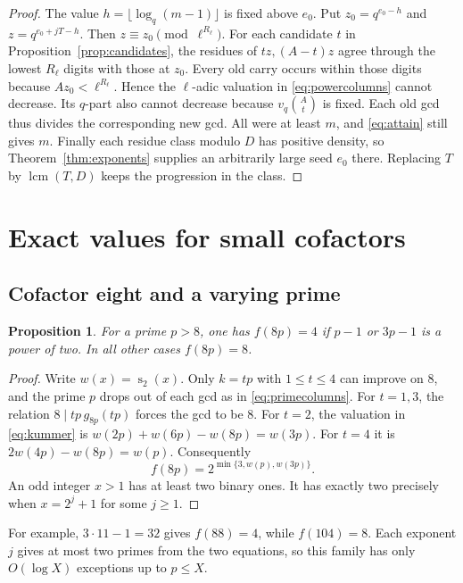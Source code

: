 \documentclass[a4paper,11pt]{article}
\newtheorem{proposition}[theorem]{Proposition}
\newcommand{\colg}[2]{g_{#1}(#2)}
\newcommand{\ds}{\operatorname{s}}
\newcommand{\lcm}{\operatorname{lcm}}
\begin{document}
\begin{proof}
The value \(h=\lfloor\log_q(m-1)\rfloor\) is fixed above \(e_0\).
Put \(z_0=q^{e_0-h}\) and \(z=q^{e_0+jT-h}\). Then
\(z\equiv z_0\pmod{\ell^{R_\ell}}\). For each candidate \(t\) in
Proposition~\ref{prop:candidates}, the residues of \(tz,(A-t)z\) agree
through the lowest \(R_\ell\) digits with those at \(z_0\).
Every old carry occurs within those digits because \(Az_0<\ell^{R_\ell}\).
Hence the \(\ell\)-adic valuation in \eqref{eq:powercolumns} cannot
decrease. Its \(q\)-part also cannot decrease because \(v_q\binom At\)
is fixed. Each old gcd thus divides the corresponding new gcd. All were
at least \(m\), and \eqref{eq:attain} still gives \(m\).
Finally each residue class modulo \(D\) has positive density, so
Theorem~\ref{thm:exponents} supplies an arbitrarily large seed \(e_0\)
there. Replacing \(T\) by \(\lcm(T,D)\) keeps the progression in the class.
\end{proof}

\newpage
\section{Exact values for small cofactors}\label{sec:families}

\subsection{Cofactor eight and a varying prime}

\begin{proposition}\label{prop:eight}
For a prime \(p>8\), one has \(f(8p)=4\) if \(p-1\) or \(3p-1\) is
a power of two. In all other cases \(f(8p)=8\).
\end{proposition}

\begin{proof}
Write \(w(x)=\ds_2(x)\). Only \(k=tp\) with \(1\le t\le4\) can improve
on \(8\), and the prime \(p\) drops out of each gcd as in
\eqref{eq:primecolumns}. For \(t=1,3\), the relation
\(8\mid tp\,\colg{8p}{tp}\) forces the gcd to be \(8\).
For \(t=2\), the valuation in \eqref{eq:kummer} is
\(w(2p)+w(6p)-w(8p)=w(3p)\). For \(t=4\) it is \(2w(4p)-w(8p)=w(p)\).
Consequently
\[
  f(8p)=2^{\min\{3,w(p),w(3p)\}} .
\]
An odd integer \(x>1\) has at least two binary ones. It has exactly two
precisely when \(x=2^j+1\) for some \(j\ge1\).
\end{proof}

For example, \(3\cdot11-1=32\) gives \(f(88)=4\), while \(f(104)=8\).
Each exponent \(j\) gives at most two primes from the two equations, so
this family has only \(O(\log X)\) exceptions up to \(p\le X\).
\end{document}
